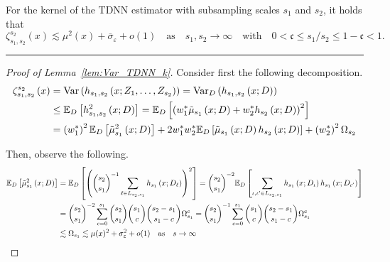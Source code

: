 \newpage
\begin{lem}\label{lem:Var_TDNN_k}
	For the kernel of the TDNN estimator with subsampling scales $s_1$ and $s_2$, it holds that
	\begin{equation}
		\zeta_{s_1, s_2}^{s_2}\left(x\right)
		\lesssim \mu^2(x) + \overline{\sigma}_{\varepsilon} + o(1)
		\quad \text{as} \quad s_1, s_2 \rightarrow \infty
		\quad \text{with} \quad
		0 < \mathfrak{c} \leq s_1 / s_2 \leq 1 - \mathfrak{c} < 1.
	\end{equation}
\end{lem}
\hrule
\begin{proof}[Proof of Lemma~\ref{lem:Var_TDNN_k}]
	Consider first the following decomposition.
	\begin{equation}
		\begin{aligned}
			\zeta_{s_1, s_2}^{s_2}\left(x\right)
			 & = \text{Var}\left(h_{s_1, s_2}\left(x; Z_1, \ldots, Z_{s_2}\right)\right)
			= \text{Var}_{D}\left(h_{s_1, s_2}\left(x; D\right)\right)                                     \\
			 & \leq \mathbb{E}_{D}\left[h_{s_1, s_2}^{2}\left(x; D\right)\right]
			= \mathbb{E}_{D}\left[
				\left(w_{1}^{*}\tilde{\mu}_{s_1}\left(x; D\right) + w_{2}^{*} h_{s_2}\left(x; D\right)\right)^2
			\right]                                                                                           \\
			 & = \left(w_{1}^{*}\right)^2\mathbb{E}_{D}\left[\tilde{\mu}_{s_1}^{2}\left(x; D\right)\right]
			+ 2 w_{1}^{*}w_{2}^{*} \mathbb{E}_{D}\left[\tilde{\mu}_{s_1}\left(x; D\right) h_{s_2}\left(x; D\right)\right]
			+ \left(w_{2}^{*}\right)^2\Omega_{s_2}
		\end{aligned}
	\end{equation}

	Then, observe the following.
	\begin{equation}
		\begin{aligned}
			\mathbb{E}_{D}\left[\tilde{\mu}_{s_1}^{2}\left(x; D\right)\right]
			 & = \mathbb{E}_D\left[\left(\binom{s_2}{s_1}^{-1}\sum_{\ell \in L_{s_2, s_1}} h_{s_1}\left(x; D_{\ell}\right)\right)^2\right]
			= \binom{s_2}{s_1}^{-2} \mathbb{E}_{D}\left[\sum_{\iota, \iota' \in L_{s_2, s_1}}h_{s_1}\left(x; D_{\iota}\right)h_{s_1}\left(x; D_{\iota'}\right)\right] \\
			 & = \binom{s_2}{s_1}^{-2} \sum_{c = 0}^{s_1} \binom{s_2}{s_1}\binom{s_1}{c}\binom{s_2 - s_1}{s_1 - c} \Omega_{s_1}^{c}
			= \binom{s_2}{s_1}^{-1} \sum_{c = 0}^{s_1} \binom{s_1}{c}\binom{s_2 - s_1}{s_1 - c} \Omega_{s_1}^{c}                                                                \\
			 & \lesssim \Omega_{s_1}
			\lesssim \mu(x)^2 + \sigma_{\varepsilon}^2 + o(1)
			\quad \text{as} \quad s \rightarrow \infty
		\end{aligned}
	\end{equation}


\end{proof}
